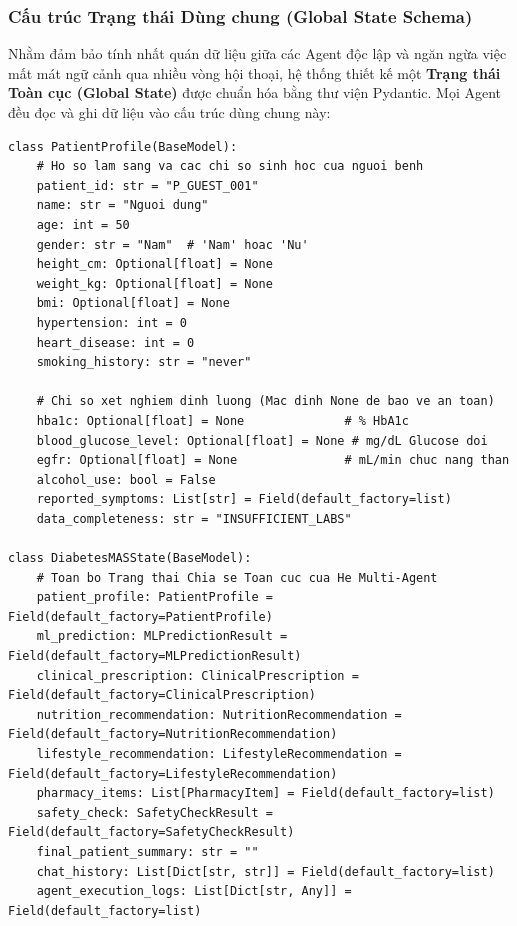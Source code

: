 \documentclass[12pt,a4paper]{article}
\begin{document}
\subsubsection{Cấu trúc Trạng thái Dùng chung (Global State Schema)}
Nhằm đảm bảo tính nhất quán dữ liệu giữa các Agent độc lập và ngăn ngừa việc mất mát ngữ cảnh qua nhiều vòng hội thoại, hệ thống thiết kế một \textbf{Trạng thái Toàn cục (Global State)} được chuẩn hóa bằng thư viện Pydantic. Mọi Agent đều đọc và ghi dữ liệu vào cấu trúc dùng chung này:

\begin{lstlisting}[style=pythonstyle, caption={Định nghĩa Cấu trúc Trạng thái Toàn cục Pydantic (state\_schema.py)}]
class PatientProfile(BaseModel):
    # Ho so lam sang va cac chi so sinh hoc cua nguoi benh
    patient_id: str = "P_GUEST_001"
    name: str = "Nguoi dung"
    age: int = 50
    gender: str = "Nam"  # 'Nam' hoac 'Nu'
    height_cm: Optional[float] = None
    weight_kg: Optional[float] = None
    bmi: Optional[float] = None
    hypertension: int = 0
    heart_disease: int = 0
    smoking_history: str = "never"
    
    # Chi so xet nghiem dinh luong (Mac dinh None de bao ve an toan)
    hba1c: Optional[float] = None              # % HbA1c
    blood_glucose_level: Optional[float] = None # mg/dL Glucose doi
    egfr: Optional[float] = None               # mL/min chuc nang than
    alcohol_use: bool = False
    reported_symptoms: List[str] = Field(default_factory=list)
    data_completeness: str = "INSUFFICIENT_LABS"

class DiabetesMASState(BaseModel):
    # Toan bo Trang thai Chia se Toan cuc cua He Multi-Agent
    patient_profile: PatientProfile = Field(default_factory=PatientProfile)
    ml_prediction: MLPredictionResult = Field(default_factory=MLPredictionResult)
    clinical_prescription: ClinicalPrescription = Field(default_factory=ClinicalPrescription)
    nutrition_recommendation: NutritionRecommendation = Field(default_factory=NutritionRecommendation)
    lifestyle_recommendation: LifestyleRecommendation = Field(default_factory=LifestyleRecommendation)
    pharmacy_items: List[PharmacyItem] = Field(default_factory=list)
    safety_check: SafetyCheckResult = Field(default_factory=SafetyCheckResult)
    final_patient_summary: str = ""
    chat_history: List[Dict[str, str]] = Field(default_factory=list)
    agent_execution_logs: List[Dict[str, Any]] = Field(default_factory=list)
\end{lstlisting}
\end{document}
